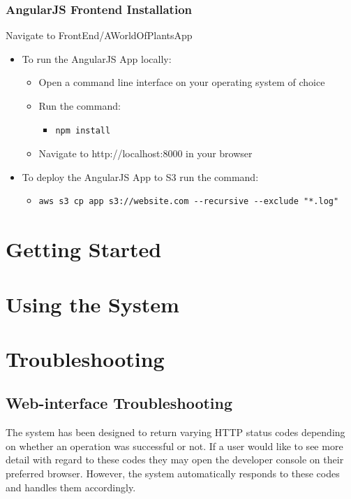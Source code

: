 \documentclass{article}
\begin{document}
		\subsubsection{AngularJS Frontend Installation}
			Navigate to FrontEnd/AWorldOfPlantsApp
			\begin{itemize}
				\item To run the AngularJS App locally:
					\begin{itemize}
						\item Open a command line interface on your operating system of choice
						\item Run the command:
							\begin{itemize}
								\item 
\begin{lstlisting}
npm install
\end{lstlisting}
							\end{itemize}
						\item Navigate to http://localhost:8000 in your browser
					\end{itemize}
				\item To deploy the AngularJS App to S3 run the command:
					\begin{itemize}
						\item
\begin{lstlisting}
aws s3 cp app s3://website.com --recursive --exclude "*.log"
\end{lstlisting}
					\end{itemize}
			\end{itemize}		

\section{Getting Started}

\section{Using the System}

\section{Troubleshooting}

\subsection{Web-interface Troubleshooting}
	The system has been designed to return varying HTTP status codes depending on whether an operation was successful or not. If a user would like to see more detail with regard to these codes they may open the developer console on their preferred browser. However, the system automatically responds to these codes and handles them accordingly.\\
	
\end{document}
